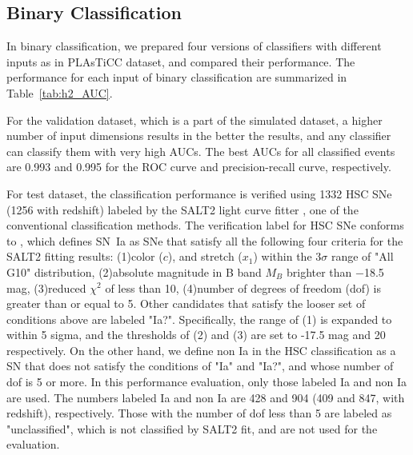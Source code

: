 \documentclass[useamsfonts]{pasj01}
\begin{document}
\subsection{Binary Classification}
\label{sec:h2}
%
In binary classification, we prepared four versions of classifiers with different inputs as in PLAsTiCC dataset, and compared their performance.
The performance for each input of binary classification are summarized in Table\ \ref{tab:h2_AUC}.

For the validation dataset, which is a part of the simulated dataset, a higher number of input dimensions results in the better the results, and any classifier can classify them with very high AUCs.
The best AUCs for all classified events are 0.993 and 0.995 for the ROC curve and precision-recall curve, respectively.

For test dataset, the classification performance is verified using 1332 HSC SNe (1256 with redshift) labeled by the SALT2 light curve fitter \citep{guy2007,guy10b}, one of the conventional classification methods.
The verification label for HSC SNe conforms to \citet{yasuda19a}, which defines SN~Ia as SNe that satisfy all the following four criteria for the SALT2 fitting results:
(1)color ($c$), and stretch ($x_1$) within the $3\sigma$ range of \citet{scolnickessler2016} "All G10" distribution, 
(2)absolute magnitude in B band $M_B$ brighter than −18.5 mag, 
(3)reduced $\chi ^{2}$ of less than 10,
(4)number of degrees of freedom (dof) is greater than or equal to 5.
Other candidates that satisfy the looser set of conditions above are labeled "Ia?".
Specifically, the range of (1) is expanded to within 5 sigma, and the thresholds of (2) and (3) are set to -17.5 mag and 20 respectively.
On the other hand, we define non Ia in the HSC classification as a SN that does not satisfy the conditions of "Ia" and "Ia?", and whose number of dof is 5 or more.
In this performance evaluation, only those labeled Ia and non Ia are used.
The numbers labeled Ia and non Ia are 428 and 904 (409 and 847, with redshift), respectively.
Those with the number of dof less than 5 are labeled as "unclassified", which is not classified by SALT2 fit, and are not used for the evaluation.
\end{document}
